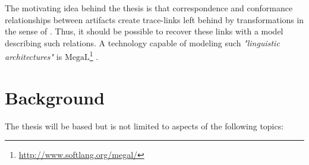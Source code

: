 \documentclass[runningheads,a4paper]{llncs}
\newcommand{\footnoteurl}[1]{\footnote{\url{#1}}}
\newcommand{\megal}{\text{MegaL}}
\begin{document}
The motivating idea behind the thesis is that correspondence and conformance relationships between artifacts create trace-links left behind by transformations in the sense of \cite{DBLP:conf/sle/Lammel16}.
Thus, it should be possible to recover these links with a model describing such relations.
A technology capable of modeling such \textit{"linguistic architectures"}\cite{DBLP:conf/models/FavreLV12} is $\megal$\footnoteurl{http://www.softlang.org/megal/} \cite{DBLP:conf/ecmdafa/LammelV14}.

\section{Background}
\label{section:Background}
The thesis will be based but is not limited to aspects of the following topics:
\end{document}
